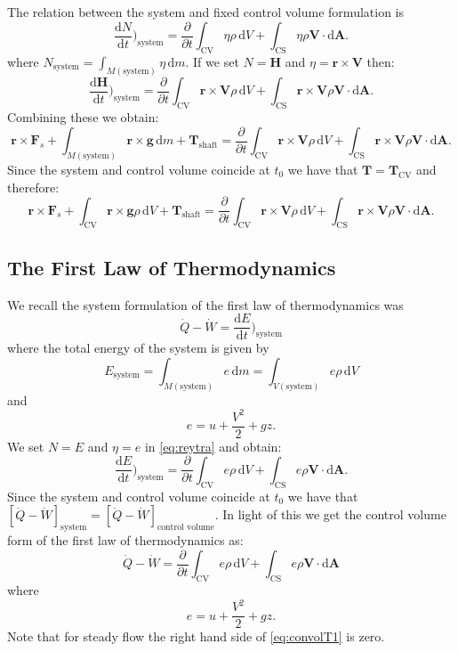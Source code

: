 The relation between the system and fixed control volume formulation is
\[ 
\frac{\mathrm{d}N}{\mathrm{d}t} \bigg)_{\mathrm{system}} = \frac{\partial }{\partial t} \int_{\mathrm{CV}} \eta \rho \, \mathrm{d}V + \int_{\mathrm{CS}} \eta \rho \textbf{V} \cdot \mathrm{d}\textbf{A}
.\]
where $N_{\mathrm{system}} = \int_{M (\mathrm{system})} \eta \, \mathrm{d}m$. If we set $N = \textbf{H}$ and $\eta = \textbf{r} \times \textbf{V}$ then:
\[ 
\frac{\mathrm{d}\textbf{H}}{\mathrm{d}t} \bigg)_{\mathrm{system}} = \frac{\partial }{\partial t} \int_{\mathrm{CV}} \textbf{r} \times \textbf{V} \rho \, \mathrm{d}V + \int_{\mathrm{CS}} \textbf{r} \times \textbf{V} \rho \textbf{V} \cdot \mathrm{d}\textbf{A}
.\]
Combining these we obtain:
\[ 
\textbf{r} \times \textbf{F}_s + \int_{M (\mathrm{system})} \textbf{r} \times \textbf{g} \, \mathrm{d}m + \textbf{T}_{\mathrm{shaft}} = \frac{\partial }{\partial t} \int_{\mathrm{CV}} \textbf{r} \times \textbf{V} \rho \, \mathrm{d}V + \int_{\mathrm{CS}} \textbf{r} \times \textbf{V} \rho \textbf{V} \cdot \mathrm{d}\textbf{A}
.\]
Since the system and control volume coincide at $t_0$ we have that $\textbf{T} = \textbf{T}_{\mathrm{CV}}$ and therefore:
\[ 
\textbf{r} \times \textbf{F}_s + \int_{\mathrm{CV}} \textbf{r} \times \textbf{g} \rho \, \mathrm{d}V + \textbf{T}_{\mathrm{shaft}} = \frac{\partial }{\partial t} \int_{\mathrm{CV}} \textbf{r} \times \textbf{V} \rho \, \mathrm{d}V + \int_{\mathrm{CS}} \textbf{r} \times \textbf{V} \rho \textbf{V} \cdot \mathrm{d}\textbf{A}
.\]

\subsection{The First Law of Thermodynamics}
We recall the system formulation of the first law of thermodynamics was
\[ 
\dot{Q} - \dot{W} = \frac{\mathrm{d}E}{\mathrm{d}t} \bigg)_{\mathrm{system}}
\]
where the total energy of the system is given by
\[ 
  E_{\mathrm{system}} = \int_{M (\mathrm{system})} e \, \mathrm{d}m = \int_{V (\mathrm{system})} e \rho \, \mathrm{d}V
\]
and
\[ 
e = u + \frac{V^2}{2} + gz
.\]
We set $N = E$ and $\eta = e$ in \autoref{eq:reytra} and obtain:
\[ 
\frac{\mathrm{d}E}{\mathrm{d}t} \bigg)_{\mathrm{system}} = \frac{\partial }{\partial t} \int_{\mathrm{CV}} e \rho \, \mathrm{d}V + \int_{\mathrm{CS}} e \rho \textbf{V} \cdot \mathrm{d} \textbf{A}
.\]
Since the system and control volume coincide at $t_0$ we have that $\left[ \dot{Q} - \dot{W} \right]_{\mathrm{system}} = \left[ \dot{Q} - \dot{W} \right]_{\text{control volume}}$. In light of this we get the control volume form of the first law of thermodynamics as:
\begin{equation} \label{eq:convolT1}
    \dot{Q} - \dot{W} = \frac{\partial }{\partial t} \int_{\mathrm{CV}} e \rho \, \mathrm{d}V + \int_{\mathrm{CS}} e \rho \textbf{V} \cdot \mathrm{d}\textbf{A}
\end{equation}
where
\[ 
e = u + \frac{V^2}{2} + gz
.\]
Note that for steady flow the right hand side of \autoref{eq:convolT1} is zero.


